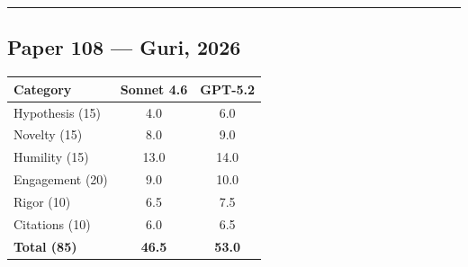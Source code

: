 \documentclass[11pt]{article}
\begin{document}
\bigskip
\hrule
\bigskip

\subsection*{Paper 108 --- Guri, 2026}

\medskip

\begin{tabular}{lcc}
\toprule
\textbf{Category} & \textbf{Sonnet 4.6} & \textbf{GPT-5.2} \\
\midrule
Hypothesis (15) & 4.0 & 6.0 \\
Novelty (15) & 8.0 & 9.0 \\
Humility (15) & 13.0 & 14.0 \\
Engagement (20) & 9.0 & 10.0 \\
Rigor (10) & 6.5 & 7.5 \\
Citations (10) & 6.0 & 6.5 \\
\midrule
\textbf{Total (85)} & \textbf{46.5} & \textbf{53.0} \\
\bottomrule
\end{tabular}

\bigskip
\end{document}
